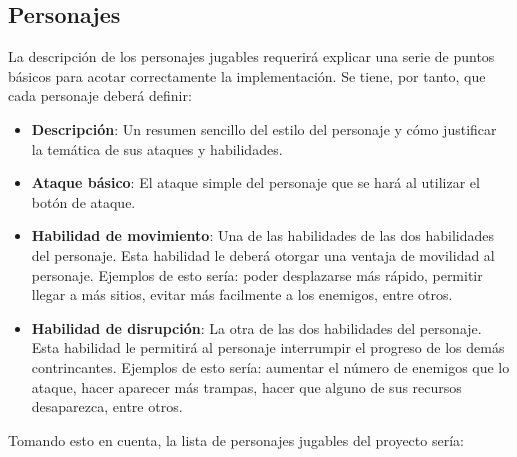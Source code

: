 \subsection{Personajes}\label{subsec:playable-characters}


La descripción de los personajes jugables requerirá explicar una serie de puntos
básicos para acotar correctamente la implementación. Se tiene, por tanto, que
cada personaje deberá definir:
\begin{itemize}
    \item \textbf{Descripción}: Un resumen sencillo del estilo del personaje y cómo
    justificar la temática de sus ataques y habilidades.
    \item \textbf{Ataque básico}: El ataque simple del personaje que se hará al utilizar
    el botón de ataque.
    \item \textbf{Habilidad de movimiento}: Una de las habilidades de las dos habilidades
    del personaje. Esta habilidad le deberá otorgar una ventaja de movilidad al
    personaje. Ejemplos de esto sería: poder desplazarse más rápido, permitir
    llegar a más sitios, evitar más facilmente a los enemigos, entre otros.
    \item \textbf{Habilidad de disrupción}: La otra de las dos habilidades del personaje.
    Esta habilidad le permitirá al personaje interrumpir el progreso de los
    demás contrincantes. Ejemplos de esto sería: aumentar el número de enemigos
    que lo ataque, hacer aparecer más trampas, hacer que alguno de sus recursos
    desaparezca, entre otros.
\end{itemize}

Tomando esto en cuenta, la lista de personajes jugables del proyecto sería:

